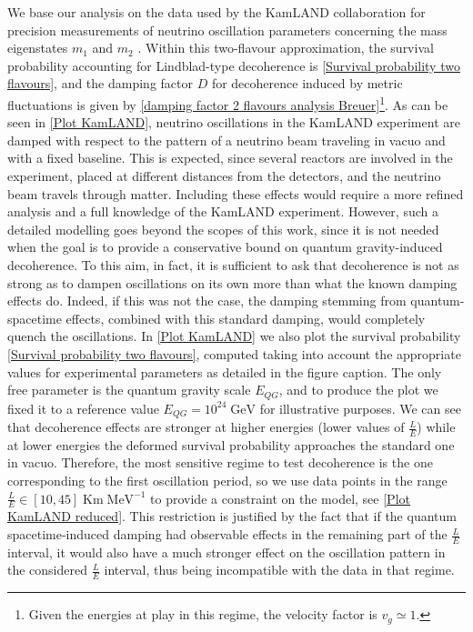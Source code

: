 \documentclass[11pt]{article}
\begin{document}
We base our analysis on the data used by the KamLAND collaboration for precision measurements of neutrino oscillation parameters concerning the mass eigenstates $m_1$ and $m_2$ \cite{KamLAND:2008dgz}.
Within this two-flavour approximation, the survival probability accounting for Lindblad-type decoherence is \eqref{Survival probability two flavours}, and the damping factor $D$ for decoherence induced by metric fluctuations \cite{Breuer:2008rh} is given by \eqref{damping factor 2 flavours analysis Breuer}\footnote{Given the energies at play in this regime, the velocity factor is $v_g\simeq1$.}.
As can be seen in \cref{Plot KamLAND}, neutrino oscillations in the KamLAND experiment are damped with respect to the pattern of a neutrino beam traveling in vacuo and with a fixed baseline. This is expected, since several reactors are involved in the experiment, placed at different distances from the detectors, and the neutrino beam travels through matter. Including these effects would require a more refined analysis and a full knowledge of the KamLAND experiment. However, such a detailed modelling goes beyond the scopes of this work, since it is not needed when the goal is to provide a conservative bound on quantum gravity-induced decoherence. To this aim, in fact, it is sufficient to ask that decoherence is not as strong as to dampen oscillations on its own more than what the known damping effects do. Indeed, if this was not the case, the damping stemming from quantum-spacetime effects, combined with this standard damping, would completely quench the oscillations.
In \cref{Plot KamLAND} we also plot the survival probability \eqref{Survival probability two flavours}, computed taking into account the appropriate values for experimental parameters as detailed in the figure caption. The only free parameter is the quantum gravity scale $E_{QG}$, and to produce the plot we fixed it to a reference value $E_{QG} = 10^{24}\;\text{GeV}$ for illustrative purposes. We can see that decoherence effects are stronger at higher energies (lower values of $\frac{L}{E}$) while at lower energies the deformed survival probability approaches the standard one in vacuo. Therefore, the most sensitive regime to test decoherence is the one corresponding to the first oscillation period, so we use data points in the range $\frac{L}{E}\in [10,45]\;\text{Km}\; \text{MeV}^{-1}$ to provide a constraint on the model, see \cref{Plot KamLAND reduced}. This restriction is justified by the fact that if the quantum spacetime-induced damping had observable effects in the remaining part of the $\frac{L}{E}$ interval, it would also have a much stronger effect on the oscillation pattern in the considered $\frac{L}{E}$ interval, thus being incompatible with the data in that regime.
\end{document}
